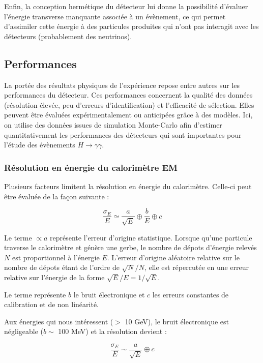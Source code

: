 \documentclass[11pt]{article} %
\begin{document}
Enfin, la conception hermétique du détecteur lui donne la possibilité d'évaluer l'énergie transverse manquante associée à un évènement, ce qui permet d'assimiler cette énergie à des particules produites qui n'ont pas interagit avec les détecteurs (probablement des neutrinos).

\subsection{Performances}

La portée des résultats physiques de l'expérience repose entre autres sur les performances du détecteur. Ces performances concernent la qualité des données (résolution élevée, peu d'erreurs d'identification) et l'efficacité de sélection. Elles peuvent être évaluées expérimentalement ou anticipées grâce à des modèles. Ici, on utilise des données issues de simulation Monte-Carlo afin d'estimer quantitativement les performances des détecteurs qui sont importantes pour l'étude des évènements $H \to \gamma \gamma$.

\subsubsection{Résolution en énergie du calorimètre EM}

Plusieurs facteurs limitent la résolution en énergie du calorimètre. Celle-ci peut être évaluée de la façon suivante :

\begin{equation}
\dfrac{\sigma_E}{E} \simeq \dfrac{a}{\sqrt{E}} \oplus \dfrac{b}{E} \oplus c
\end{equation}

Le terme $\propto a$ représente l'erreur d'origine statistique. Lorsque qu'une particule traverse le calorimètre et génère une gerbe, le nombre de dépots d'énergie relevés $N$ est proportionnel à l'énergie $E$. L'erreur d'origine aléatoire relative sur le nombre de dépots étant de l'ordre de $\sqrt{N}/N$, elle est répercutée en une erreur relative sur l'énergie de la forme $\sqrt{E}/E = 1/\sqrt{E}$.

Le terme représente $b$ le bruit électronique et $c$ les erreurs constantes de calibration et de non linéarité.

Aux énergies qui nous intéressent ($>$ 10 GeV), le bruit électronique est négligeable ($b \sim$ 100 MeV) et la résolution devient :

\begin{equation}
\dfrac{\sigma_E}{E} \sim \dfrac{a}{\sqrt{E}} \oplus c
\end{equation}
\end{document}

